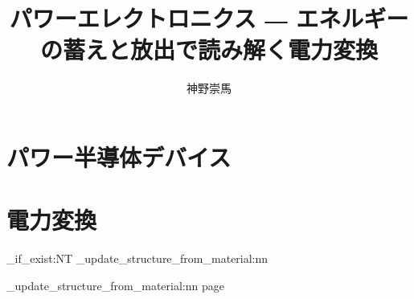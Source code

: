 \documentclass[mentuke,nosetpagesize]{corona-a5-1.1}
\title{パワーエレクトロニクス ― エネルギーの蓄えと放出で読み解く電力変換}
\author{神野崇馬}
\begin{document}

\mbox{}\thispagestyle{empty}
\tableofcontents

\PEprologuenumbering

\PErestorenumbering

\part{パワー半導体デバイス}
\setcounter{chapter}{1}
\setcounter{chapter}{2}

\part{電力変換}
\setcounter{chapter}{3}
\setcounter{chapter}{4}
\setcounter{chapter}{5}
\setcounter{chapter}{6}
\setcounter{chapter}{7}
\setcounter{chapter}{8}
\setcounter{chapter}{9}





\ExplSyntaxOn
\cs_if_exist:NT \mark_update_structure_from_material:nn
  { \mark_update_structure_from_material:nn {page} {  } }
\ExplSyntaxOff
\printindex
\end{document}
